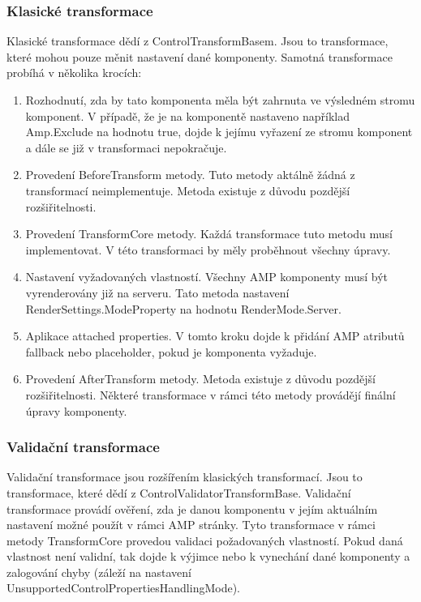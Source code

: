 \subsubsection{Klasické transformace}
    Klasické transformace dědí z ControlTransformBasem. Jsou to transformace, které mohou pouze měnit nastavení dané komponenty. Samotná transformace probíhá v několika krocích:
    \begin{enumerate}
        \item Rozhodnutí, zda by tato komponenta měla být zahrnuta ve výsledném stromu komponent.\newline
        V případě, že je na komponentě nastaveno například Amp.Exclude na hodnotu true, dojde k jejímu vyřazení ze stromu komponent a dále se již v transformaci nepokračuje.
        \item Provedení BeforeTransform metody.\newline
        Tuto metody aktálně žádná z transformací neimplementuje. Metoda existuje z důvodu pozdější rozšiřitelnosti.
        \item Provedení TransformCore metody.\newline
        Každá transformace tuto metodu musí implementovat. V této transformaci by měly proběhnout všechny úpravy. 
        \item Nastavení vyžadovaných vlastností.\newline
        Všechny AMP komponenty musí být vyrenderovány již na serveru. Tato metoda nastavení RenderSettings.ModeProperty na hodnotu RenderMode.Server.
        \item Aplikace attached properties.\newline
        V tomto kroku dojde k přidání AMP atributů fallback nebo placeholder, pokud je komponenta vyžaduje.
        \item Provedení AfterTransform metody.\newline
        Metoda existuje z důvodu pozdější rozšiřitelnosti. Některé transformace v rámci této metody provádějí finální úpravy komponenty.
    \end{enumerate}
\subsubsection{Validační transformace}
    Validační transformace jsou rozšířením klasických transformací. Jsou to transformace, které dědí z ControlValidatorTransformBase. Validační transformace provádí ověření, zda je danou komponentu v jejím aktuálním nastavení možné použít v rámci AMP stránky. Tyto transformace v rámci metody TransformCore provedou validaci požadovaných vlastností. Pokud daná vlastnost není validní, tak dojde k výjimce nebo k vynechání dané komponenty a zalogování chyby (záleží na nastavení UnsupportedControlPropertiesHandlingMode).
